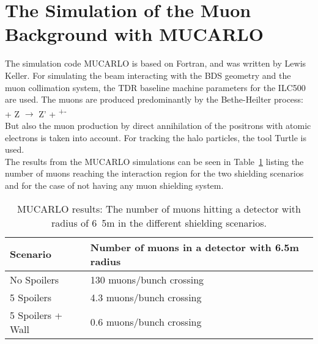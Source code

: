 \section{The Simulation of the Muon Background with MUCARLO}
\label{MUCARLO}

The simulation code MUCARLO is based on Fortran, and was written by Lewis Keller.
For simulating the beam interacting with the BDS geometry and the muon collimation system, the TDR baseline machine parameters for the ILC500 are used.
The muons are produced predominantly by the Bethe-Heilter process:\\
\textgamma + Z $\rightarrow$ Z' + \textmu\textsuperscript{+}\textmu\textsuperscript{-}\\
But also the muon production by direct annihilation of the positrons with atomic electrons is taken into account.
For tracking the halo particles, the tool Turtle is used.\\
The results from the MUCARLO simulations can be seen in Table~\ref{tab:MuonRates} listing the number of muons reaching the interaction region for the two shielding scenarios and for the case of not having any muon shielding system.

\begin{table}
\caption{MUCARLO results: The number of muons hitting a detector with radius of \unit{6.5}{m} in the different shielding scenarios.}
\label{tab:MuonRates}
\centering
\begin{tabularx}{\textwidth}{ll}
\hline\hline
\textbf{Scenario} & \textbf{Number of muons in a detector with 6.5m radius}\\
\hline
\cline{1-2}
\hline
 No Spoilers & 130 muons/bunch crossing\\
 5 Spoilers& 4.3 muons/bunch crossing\\
 5 Spoilers + Wall & 0.6 muons/bunch crossing\\
\hline\hline
\end{tabularx}
\end{table}